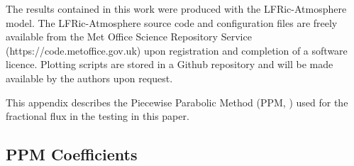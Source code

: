\documentclass{ametsocV6.1}
\begin{document}
% 
%
\datastatement

The results contained in this work were produced with the LFRic-Atmosphere model.
The LFRic-Atmosphere source code and configuration files are freely available from the Met Office Science Repository Service \\
(https://code.metoffice.gov.uk) upon registration and completion of a software licence.
Plotting scripts are stored in a Github repository and will be made available by the authors upon request.


\appendix[A] \label{sec:ppm_appendix}


This appendix describes the Piecewise Parabolic Method (PPM, \citet{colella1984ppm}) used for the fractional flux in the testing in this paper.

\subsection{PPM Coefficients} \label{sec:ppm_recon}
\end{document}
